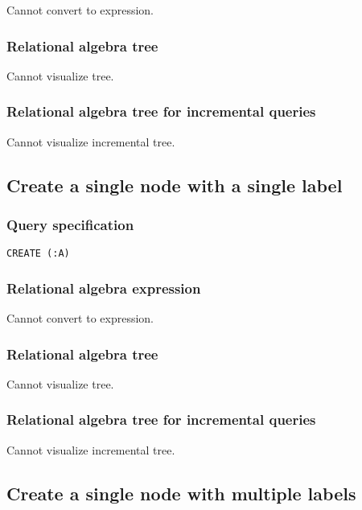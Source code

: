 Cannot convert to expression.

\subsubsection*{Relational algebra tree}

Cannot visualize tree.

\subsubsection*{Relational algebra tree for incremental queries}

Cannot visualize incremental tree.

\subsection{Create a single node with a single label}

\subsubsection*{Query specification}

\begin{lstlisting}
CREATE (:A)
\end{lstlisting}

\subsubsection*{Relational algebra expression}

Cannot convert to expression.

\subsubsection*{Relational algebra tree}

Cannot visualize tree.

\subsubsection*{Relational algebra tree for incremental queries}

Cannot visualize incremental tree.

\subsection{Create a single node with multiple labels}

